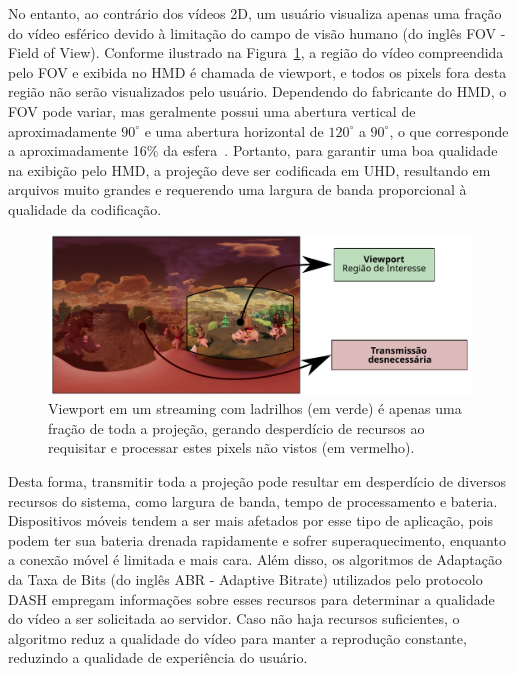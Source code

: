 No entanto, ao contrário dos vídeos 2D, um usuário visualiza apenas uma fração do vídeo esférico devido à limitação do campo de visão humano (do inglês FOV - Field of View). Conforme ilustrado na Figura~\ref{fig:viewport1}, a região do vídeo compreendida pelo FOV e exibida no HMD é chamada de viewport, e todos os pixels fora desta região não serão visualizados pelo usuário. Dependendo do fabricante do HMD, o FOV pode variar, mas geralmente possui uma abertura vertical de aproximadamente $90^{\circ}$ e uma abertura horizontal de $120^{\circ}$ a $90^{\circ}$, o que corresponde a aproximadamente 16\% da esfera~\cite{Afzal2017}. Portanto, para garantir uma boa qualidade na exibição pelo HMD, a projeção deve ser codificada em UHD, resultando em arquivos muito grandes e requerendo uma largura de banda proporcional à qualidade da codificação.

\begin{figure}[h]
        \centering
        \includegraphics[width=0.80\columnwidth]{fig/viewport1.pdf}
        \caption{Viewport em um streaming com ladrilhos (em verde) é apenas uma fração de toda a projeção, gerando desperdício de recursos ao requisitar e processar estes pixels não vistos (em vermelho).}
        \label{fig:viewport1}
\end{figure}

Desta forma, transmitir toda a projeção pode resultar em desperdício de diversos recursos do sistema, como largura de banda, tempo de processamento e bateria. Dispositivos móveis tendem a ser mais afetados por esse tipo de aplicação, pois podem ter sua bateria drenada rapidamente e sofrer superaquecimento, enquanto a conexão móvel é limitada e mais cara. Além disso, os algoritmos de Adaptação da Taxa de Bits (do inglês ABR - Adaptive Bitrate) utilizados pelo protocolo DASH empregam informações sobre esses recursos para determinar a qualidade do vídeo a ser solicitada ao servidor. Caso não haja recursos suficientes, o algoritmo reduz a qualidade do vídeo para manter a reprodução constante, reduzindo a qualidade de experiência do usuário.

